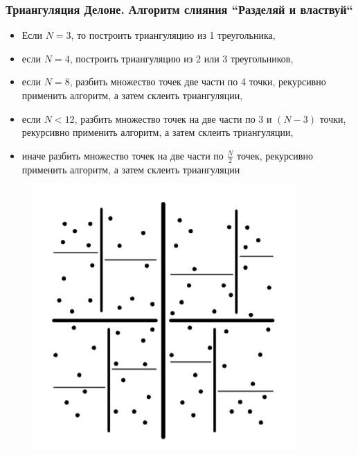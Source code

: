\documentclass[notheorems,aspectratio=169]{beamer}
\begin{document}
\begin{frame}\frametitle{Триангуляция Делоне. Алгоритм слияния ``Разделяй и властвуй``}
	\begin{itemize}
		\item Если $N = 3$, то построить триангуляцию из 1 треугольника,
		\item если $N = 4$, построить триангуляцию из 2 или 3 треугольников,
		\item если $N = 8$, разбить множество точек две части по 4 точки, рекурсивно применить алгоритм, а затем склеить триангуляции,
		\item если $N < 12$, разбить множество точек на
		две части по 3 и $(N − 3)$ точки, рекурсивно применить алгоритм, а затем
		склеить триангуляции,
		\item иначе разбить множество точек на две
		части по $\frac{N}{2}$ точек, рекурсивно применить алгоритм, а затем
		склеить триангуляции
	\end{itemize}
	\begin{figure}
		\includegraphics[height=0.2\textheight, keepaspectratio]{rv.png}
	\end{figure}
\end{frame}
\end{document}
